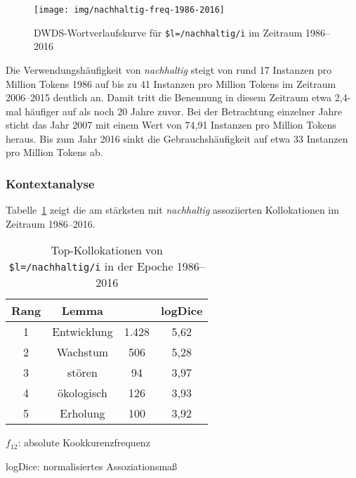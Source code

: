 \documentclass[
    german,
    a4paper,%
    12pt,%
    oneside,%
    toc=bibliography,
    final,
]{scrartcl}
\begin{document}
\begin{figure}[h!]
	\centering
	
	\texttt{[image: img/nachhaltig-freq-1986-2016]}
	\caption[corpus-size]{DWDS-Wortverlaufskurve für \lstinline|$l=/nachhaltig/i| im Zeitraum 1986–2016\protect\footnotemark}
	\label{fig:nachhaltig-freq-1986-2016}
\end{figure}


Die Verwendungshäufigkeit von \textit{nachhaltig} steigt von rund 17 Instanzen pro Million Tokens 1986 auf bis zu 41 Instanzen pro Million Tokens im Zeitraum 2006–2015 deutlich an. Damit tritt die Benennung in diesem Zeitraum etwa 2,4-mal häufiger auf als noch 20 Jahre zuvor. Bei der Betrachtung einzelner Jahre sticht das Jahr 2007 mit einem Wert von 74,91 Instanzen pro Million Tokens heraus. Bis zum Jahr 2016 sinkt die Gebrauchshäufigkeit auf etwa 33 Instanzen pro Million Tokens ab.

\subsubsection{Kontextanalyse}

Tabelle~\ref{tab:kollokationen-epoche4} zeigt die am stärksten mit \textit{nachhaltig} assoziierten Kollokationen im Zeitraum 1986–2016.

\begin{table}[h!]
	\centering
	\renewcommand{\arraystretch}{1.5}
	
	\caption{Top-Kollokationen von \lstinline|$l=/nachhaltig/i| in der Epoche 1986–2016\protect\footnotemark}
	\label{tab:kollokationen-epoche4}
	
	\begin{threeparttable}
	
	\begin{tabular}{cccc}
	\textbf{Rang} & \textbf{Lemma} & \boldmath{$f_{12}$} & \textbf{logDice} \\ \hline
	1 & Entwicklung & 1.428 & 5,62 \\ \hline
	2 & Wachstum & 506 & 5,28 \\ \hline
	3 & stören & 94 & 3,97 \\ \hline
	4 & ökologisch & 126 & 3,93 \\ \hline
	5 & Erholung & 100 & 3,92 \\ \hline
	\end{tabular} 
	
	\begin{tablenotes}
	\footnotesize
	\setlength{\itemindent}{-1.2em}
	\item $f_{12}$: absolute Kookkurenzfrequenz
	\item logDice: normalisiertes Assoziationsmaß
	\end{tablenotes}
	
	\end{threeparttable}
\end{table}
\end{document}

